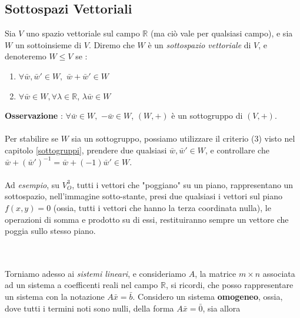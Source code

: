 \documentclass[12pt, letterpaper]{article}
\newcommand{\R}{{\mathbb R}}
\newcommand{\acc}{\\\hphantom{}\\}
\begin{document}
\subsection{Sottospazi Vettoriali}
Sia \(V\) uno spazio vettoriale sul campo \(\mathbb{R}\) (ma ciò vale per qualsiasi campo), e sia \(W\) un sottoinsieme di \(V\). Diremo che \(W\) è un \textit{sottospazio 
vettoriale} di \(V\), e denoteremo \(W\le V\) se : \begin{enumerate}
    \item \(\forall \bar w, \bar w' \in W,\) \(\bar w+\bar w' \in W\)
    \item \(\forall \bar w \in W, \forall \lambda \in \mathbb{R}\), \(\lambda\bar w \in W\)
\end{enumerate}
\textbf{Osservazione} : \(\forall \bar w \in W,\) \(-\bar w \in W\), \((W,+)\) è un sottogruppo di \((V,+)\).\acc 
Per stabilire se \(W\) sia un sottogruppo, possiamo utilizzare il criterio {\color{blue}(3)} visto 
nel capitolo \ref{sottogruppi}, prendere due qualsiasi \(\bar w,\bar w'\in W\), e controllare che 
\(\bar w + (\bar w')^{-1}=\bar w + (-1)\bar w' \in W\).\acc 
Ad \textit{esempio}, su \(V_O^3\), tutti i vettori che "poggiano" su un piano, rappresentano un 
sottospazio, nell'immagine sotto-stante, presi due qualsiasi i vettori sul piano \(f(x,y)=0\) (ossia, tutti i vettori 
che hanno la terza coordinata nulla), le operazioni 
di somma e prodotto su di essi, restituiranno sempre un vettore che poggia sullo stesso piano.
\begin{figure}[h]
\end{figure}
\acc Torniamo adesso ai \textit{sistemi lineari}, e consideriamo \(A\), la matrice \(m\times n\) associata 
ad un sistema a coefficenti reali nel campo \(\R\), si ricordi, che posso rappresentare un 
sistema con la notazione \(A\bar x = \bar b\). Considero un sistema \textbf{omogeneo}, ossia, dove 
tutti i termini noti sono nulli, della forma \(A\bar x = \bar 0\), sia allora 
\end{document}
